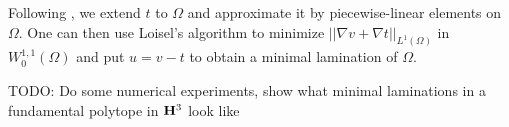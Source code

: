 Following \cite[\S4]{Loisel20}, we extend $t$ to $\Omega$ and approximate it by piecewise-linear elements on $\Omega$.
One can then use Loisel's algorithm to minimize $||\nabla v + \nabla t||_{L^1(\Omega)}$ in $W^{1, 1}_0(\Omega)$ and put $u = v - t$ to obtain a minimal lamination of $\Omega$.

TODO: Do some numerical experiments, show what minimal laminations in a fundamental polytope in $\mathbf H^3$ look like
